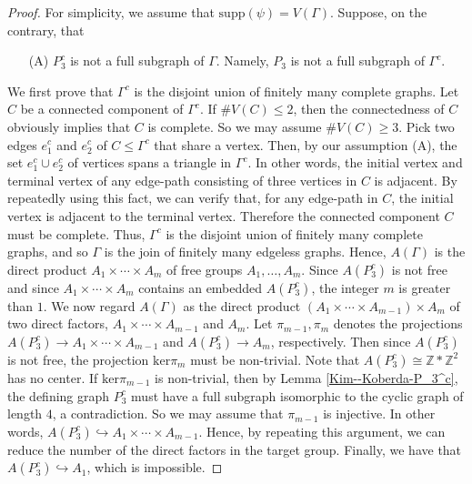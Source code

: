 \documentclass{amsart}
\theoremstyle{definition}
\theoremstyle{plain}
\numberwithin{equation}{section}
\begin{document}
\begin{proof}
For simplicity, we assume that $\mathrm{supp}(\psi) = V(\Gamma)$. 
Suppose, on the contrary, that 
\begin{itemize}
 \item[(A)] $P_3^c$ is not a full subgraph of $\Gamma$. Namely, $P_3$ is not a full subgraph of $\Gamma^c$. 
\end{itemize}
We first prove that $\Gamma^c$ is the disjoint union of finitely many complete graphs. 
Let $C$ be a connected component of $\Gamma^c$. 
If $\# V(C) \leq 2$, then the connectedness of $C$ obviously implies that $C$ is complete. 
So we may assume $\# V(C) \geq 3$. 
Pick two edges $e_1^c$ and $e_2^c$ of $C \leq \Gamma^c$ that share a vertex. 
Then, by our assumption (A), the set $e_1^c \cup e_2^c$ of vertices spans a triangle in $\Gamma^c$. 
In other words, the initial vertex and terminal vertex of any edge-path consisting of three vertices in $C$ is adjacent. 
By repeatedly using this fact, we can verify that, for any edge-path in $C$, the initial vertex is adjacent to the terminal vertex. 
Therefore the connected component $C$ must be complete. 
Thus, $\Gamma^c$ is the disjoint union of finitely many complete graphs, and so $\Gamma$ is the join of finitely many edgeless graphs. 
Hence, $A(\Gamma)$ is the direct product $A_1 \times \cdots \times A_m$ of free groups $A_1, \ldots, A_m$. 
Since $A(P_3^c)$ is not free and since $A_1 \times \cdots \times A_m$ contains an embedded $A(P_3^c)$, the integer $m$ is greater than $1$. 
We now regard $A(\Gamma)$ as the direct product $(A_1 \times \cdots \times A_{m-1}) \times A_m$ of two direct factors, $A_1 \times \cdots \times A_{m-1}$ and $A_m$. 
Let $\pi_{m-1}, \pi_m$ denotes the projections $A(P_3^c) \rightarrow A_1 \times \cdots \times A_{m-1}$ and $A(P_3^c) \rightarrow A_m$, respectively. 
Then since $A(P_3^c)$ is not free, the projection $\mathrm{ker}\pi_m$ must be non-trivial. 
Note that $A(P_3^c) \cong \mathbb{Z} * \mathbb{Z}^2$ has no center. 
If $\mathrm{ker} \pi_{m-1}$ is non-trivial, then by Lemma \ref{Kim--Koberda-P_3^c}, the defining graph $P_3^c$ must have a full subgraph isomorphic to the cyclic graph of length $4$, a contradiction. 
So we may assume that $\pi_{m-1}$ is injective. 
In other words, $A(P_3^c) \hookrightarrow A_1 \times \cdots \times A_{m-1}$. 
Hence, by repeating this argument, we can reduce the number of the direct factors in the target group. 
Finally, we have that $A(P_3^c) \hookrightarrow A_1$, which is impossible. 
\end{proof}
\end{document}
